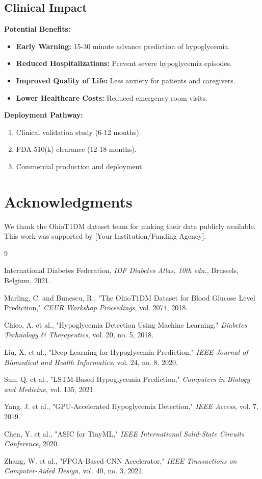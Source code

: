 \documentclass[11pt, a4paper]{article}
\begin{document}
\subsection{Clinical Impact}

\textbf{Potential Benefits:}
\begin{itemize}
    \item \textbf{Early Warning:} 15-30 minute advance prediction of hypoglycemia.
    \item \textbf{Reduced Hospitalizations:} Prevent severe hypoglycemia episodes.
    \item \textbf{Improved Quality of Life:} Less anxiety for patients and caregivers.
    \item \textbf{Lower Healthcare Costs:} Reduced emergency room visits.
\end{itemize}

\textbf{Deployment Pathway:}
\begin{enumerate}
    \item Clinical validation study (6-12 months).
    \item FDA 510(k) clearance (12-18 months).
    \item Commercial production and deployment.
\end{enumerate}

\section*{Acknowledgments}

We thank the OhioT1DM dataset team for making their data publicly available. This work was supported by [Your Institution/Funding Agency].


\begin{thebibliography}{9}

International Diabetes Federation, \textit{IDF Diabetes Atlas, 10th edn.}, Brussels, Belgium, 2021.

Marling, C. and Bunescu, R., "The OhioT1DM Dataset for Blood Glucose Level Prediction," \textit{CEUR Workshop Proceedings}, vol. 2074, 2018.

Chico, A. et al., "Hypoglycemia Detection Using Machine Learning," \textit{Diabetes Technology \& Therapeutics}, vol. 20, no. 5, 2018.

Liu, X. et al., "Deep Learning for Hypoglycemia Prediction," \textit{IEEE Journal of Biomedical and Health Informatics}, vol. 24, no. 8, 2020.

Sun, Q. et al., "LSTM-Based Hypoglycemia Prediction," \textit{Computers in Biology and Medicine}, vol. 135, 2021.

Yang, J. et al., "GPU-Accelerated Hypoglycemia Detection," \textit{IEEE Access}, vol. 7, 2019.

Chen, Y. et al., "ASIC for TinyML," \textit{IEEE International Solid-State Circuits Conference}, 2020.

Zhang, W. et al., "FPGA-Based CNN Accelerator," \textit{IEEE Transactions on Computer-Aided Design}, vol. 40, no. 3, 2021.

\end{thebibliography}
\end{document}
